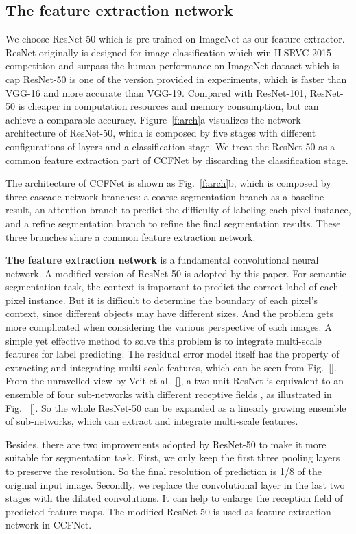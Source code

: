 \documentclass[10.5pt,compsoc]{TsT}
\theoremstyle{mystyle}
\begin{document}
{\subsection{The feature extraction network}
\label{s:feature}
\noindent

We choose ResNet-50 which is pre-trained on ImageNet as our feature extractor. ResNet originally is designed for image classification which win ILSRVC 2015 competition and surpass the human performance on ImageNet dataset which is cap
ResNet-50 is one of the version provided in experiments, which is faster than VGG-16 and more accurate than VGG-19.
Compared with ResNet-101, ResNet-50 is cheaper in computation resources and memory consumption, but can achieve a comparable accuracy.
Figure~\ref{f:arch}a  visualizes the network architecture of ResNet-50, which is composed by five stages with different configurations of layers and a classification stage.
We treat the ResNet-50 as a common feature extraction part of CCFNet by discarding the classification stage.


The architecture of CCFNet is shown as Fig.~\ref{f:arch}b, which is composed by three cascade network branches: a coarse segmentation branch as a baseline result, an attention branch to predict the difficulty of labeling each pixel instance, and a refine segmentation branch to refine the final segmentation results. 
These three branches share a common feature extraction network.

\textbf{The feature extraction network} is a fundamental convolutional neural network.
A modified version of ResNet-50 is adopted by this paper.
For semantic segmentation task,  the context is important to predict the correct label of each pixel instance.
But it is difficult to determine the boundary of each pixel's context, since different objects may have different sizes.
And the problem gets more complicated when considering the various perspective of each images.
A simple yet effective method to solve this problem is to integrate multi-scale features for label predicting.
The residual error model itself has the property of extracting and integrating multi-scale features, which can be seen from Fig.~\ref{}.
From the unravelled view by Veit et al.~\ref{}, a two-unit ResNet is equivalent to an ensemble of four sub-networks with different receptive fields , as illustrated in Fig. ~\ref{}.
So the whole ResNet-50 can be expanded as a linearly growing ensemble of sub-networks, which can extract and integrate multi-scale features.

Besides, there are two improvements adopted by ResNet-50 to make it more suitable for segmentation task.
First, we only keep the first three pooling layers to preserve the resolution.
So the final resolution of prediction is 1/8 of the original input image. 
Secondly, we replace the convolutional layer in the last two stages with the dilated convolutions.
It can help to enlarge the reception field of predicted feature maps.
The modified ResNet-50 is used as feature extraction network in CCFNet.

}
\end{document}
